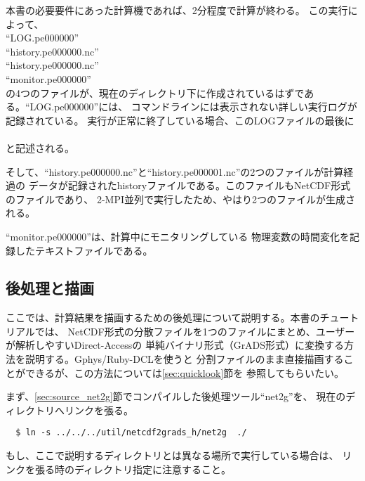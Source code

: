 本書の必要要件にあった計算機であれば、2分程度で計算が終わる。
\noindent この実行によって、\\
``LOG.pe000000''\\
``history.pe000000.nc''\\
``history.pe000000.nc''\\
``monitor.pe000000''\\
の4つのファイルが、現在のディレクトリ下に作成されているはずである。``LOG.pe000000''には、
コマンドラインには表示されない詳しい実行ログが記録されている。
実行が正常に終了している場合、このLOGファイルの最後に\\

{\small {\gt
{}}}\\
\noindent と記述される。

そして、``history.pe000000.nc''と``history.pe000001.nc''の2つのファイルが計算経過の
データが記録されたhistoryファイルである。このファイルもNetCDF形式のファイルであり、
2-MPI並列で実行したため、やはり2つのファイルが生成される。

``monitor.pe000000''は、計算中にモニタリングしている
物理変数の時間変化を記録したテキストファイルである。



\subsection{後処理と描画}
ここでは、計算結果を描画するための後処理について説明する。本書のチュートリアルでは、
NetCDF形式の分散ファイルを1つのファイルにまとめ、ユーザーが解析しやすいDirect-Accessの
単純バイナリ形式（GrADS形式）に変換する方法を説明する。Gphys/Ruby-DCLを使うと
分割ファイルのまま直接描画することができるが、この方法については\ref{sec:quicklook}節を
参照してもらいたい。

まず、\ref{sec:source_net2g}節でコンパイルした後処理ツール``net2g''を、
現在のディレクトリへリンクを張る。
\begin{verbatim}
  $ ln -s ../../../util/netcdf2grads_h/net2g  ./
\end{verbatim}
もし、ここで説明するディレクトリとは異なる場所で実行している場合は、
リンクを張る時のディレクトリ指定に注意すること。

